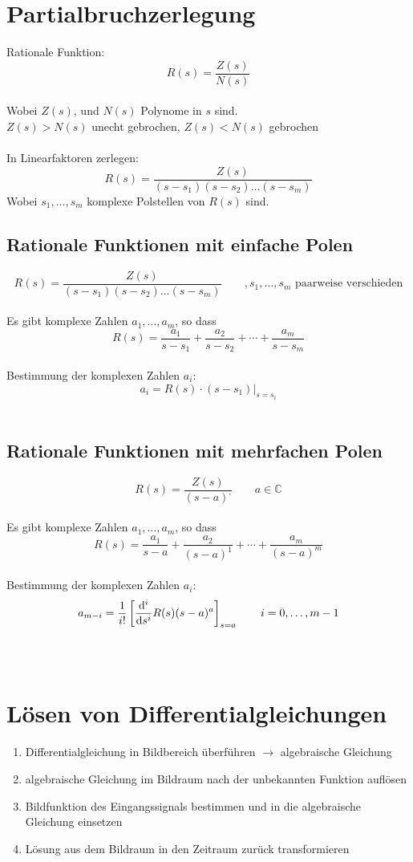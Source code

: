 \section{Partialbruchzerlegung}
Rationale Funktion:
\[
	R(s) = \frac{Z(s)}{N(s)}
\]
\\
Wobei $Z(s)$, und $N(s)$ Polynome in $s$ sind. 
\\
$Z(s) > N(s)$ unecht gebrochen, $Z(s) < N(s)$ gebrochen\\
\\
In Linearfaktoren zerlegen:
\[
	R(s) = \frac{Z(s)}{(s-s_1)(s-s_2)\ldots(s-s_m)}
\]
Wobei $s_1,\ldots ,s_m$ komplexe Polstellen von $R(s)$ sind.

\subsection{Rationale Funktionen mit einfache Polen}
\[
	R(s) = \frac{Z(s)}{(s-s_1)(s-s_2)\ldots(s-s_m)} \qquad , s_1,\ldots ,s_m \text{ paarweise verschieden}
\]
\\
Es gibt komplexe Zahlen $a_1,\ldots ,a_m$, so dass
\[
	R(s)=\frac{a_1}{s-s_1}+\frac{a_2}{s-s_2}+\cdots+\frac{a_m}{s-s_m}
\]
\\
Bestimmung der komplexen Zahlen $a_i$:
\[
	a_i=\left.R(s)\cdot(s-s_1)\right|_{s=s_i}
\]
\\

\subsection{Rationale Funktionen mit mehrfachen Polen}
\[
	R(s) = \frac{Z(s)}{(s-a)^,} \qquad a \in \mathbb{C}
\]
\\
Es gibt komplexe Zahlen $a_1,\ldots ,a_m$, so dass
\[
	R(s)=\frac{a_1}{s-a}+\frac{a_2}{(s-a)^1}+\cdots+\frac{a_m}{(s-a)^m}
\]
\\
Bestimmung der komplexen Zahlen $a_i$:
\[
	a_{m-i} = \frac{1}{i!}\left[\frac{\mathrm{d} ^i}{\mathrm{d} s^i}R(s)(s-a)^a\right]_{s=a} \qquad i=0,\ldots,m-1
\]
\\\\

\section{Lösen von Differentialgleichungen}
\begin{enumerate}
	\item Differentialgleichung in Bildbereich überführen $\rightarrow$ algebraische Gleichung
	\item algebraische Gleichung im Bildraum nach der unbekannten Funktion auflösen
	\item Bildfunktion des Eingangssignals bestimmen und in die algebraische Gleichung einsetzen
	\item Lösung aus dem Bildraum in den Zeitraum zurück transformieren
\end{enumerate}

